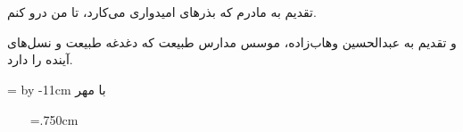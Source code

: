 \newpage
\thispagestyle{empty}
\vtitle
\newpage
\thispagestyle{empty}
\clearpage
~~~
\newpage
\thispagestyle{empty}

\newpage
\thispagestyle{empty}
\clearpage
~~~
\newpage
\begin{acknowledgementpage}

\vspace{4cm}

{\nastaliq
{\Large
تقدیم به مادرم که بذرهای امیدواری می‌کارد، تا من درو کنم.

و تقدیم به عبدالحسین وهاب‌زاده، موسس مدارس طبیعت که دغدغه طبیعت و نسل‌های آینده را دارد.
\vspace{1.5cm}

\newdimen\xa
\xa=\textwidth
\advance \xa by -11cm
\hspace{\xa}
با مهر
}}
\end{acknowledgementpage}
\newpage
\thispagestyle{empty}
\clearpage
~~~
\thispagestyle{empty}
\baselineskip=.750cm
\ \\ \\
 
